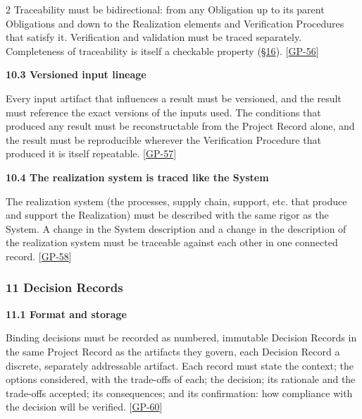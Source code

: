\begin{multicols}{2}
Traceability must be bidirectional: from any Obligation up to its parent Obligations and down to the Realization elements and Verification Procedures that satisfy it. Verification and validation must be traced separately. Completeness of traceability is itself a checkable property (\hyperlink{nss-16}{\S16}). [\hyperlink{gp-56}{GP-56}]

\hypertarget{nss-10.3}{}

\par\smallskip\noindent\textbf{10.3 Versioned input lineage}\par\nopagebreak

Every input artifact that influences a result must be versioned, and the result must reference the exact versions of the inputs used. The conditions that produced any result must be reconstructable from the Project Record alone, and the result must be reproducible wherever the Verification Procedure that produced it is itself repeatable. [\hyperlink{gp-57}{GP-57}]

\hypertarget{nss-10.4}{}

\par\smallskip\noindent\textbf{10.4 The realization system is traced like the System}\par\nopagebreak

The realization system (the processes, supply chain, support, etc. that produce and support the Realization) must be described with the same rigor as the System. A change in the System description and a change in the description of the realization system must be traceable against each other in one connected record. [\hyperlink{gp-58}{GP-58}]

\hypertarget{nss-11}{}

\subsubsection*{11 Decision Records}

\hypertarget{nss-11.1}{}

\par\smallskip\noindent\textbf{11.1 Format and storage}\par\nopagebreak

Binding decisions must be recorded as numbered, immutable Decision Records in the same Project Record as the artifacts they govern, each Decision Record a discrete, separately addressable artifact. Each record must state the context; the options considered, with the trade-offs of each; the decision; its rationale and the trade-offs accepted; its consequences; and its confirmation: how compliance with the decision will be verified. [\hyperlink{gp-60}{GP-60}]


\end{multicols}
